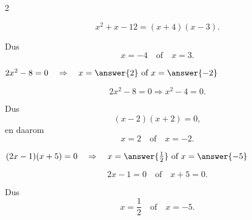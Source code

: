 \documentclass{ximera}
\begin{document}
\begin{oefening}[Vergelijkingen]{\oefB\ESS}
\begin{multicols}{2}
\begin{question}
\begin{oplossing}
\[
x^2+x-12
=(x+4)(x-3).
\]

Dus
\[
x=-4
\quad\text{of}\quad
x=3.
\]
\end{oplossing}
\end{question}


\begin{question}
$2x^2-8=0
\quad\Rightarrow\quad
x=\answer{2}\ \text{of}\ x=\answer{-2}$

\begin{oplossing}
\[
2x^2-8=0
\Rightarrow
x^2-4=0.
\]

Dus
\[
(x-2)(x+2)=0,
\]
en daarom
\[
x=2
\quad\text{of}\quad
x=-2.
\]
\end{oplossing}
\end{question}


\begin{question}
$(2x-1)(x+5)=0
\quad\Rightarrow\quad
x=\answer{\frac12}\ \text{of}\ x=\answer{-5}$

\begin{oplossing}
\[
2x-1=0
\quad\text{of}\quad
x+5=0.
\]

Dus
\[
x=\frac12
\quad\text{of}\quad
x=-5.
\]
\end{oplossing}
\end{question}

\end{multicols}

\end{oefening}

\end{document}
